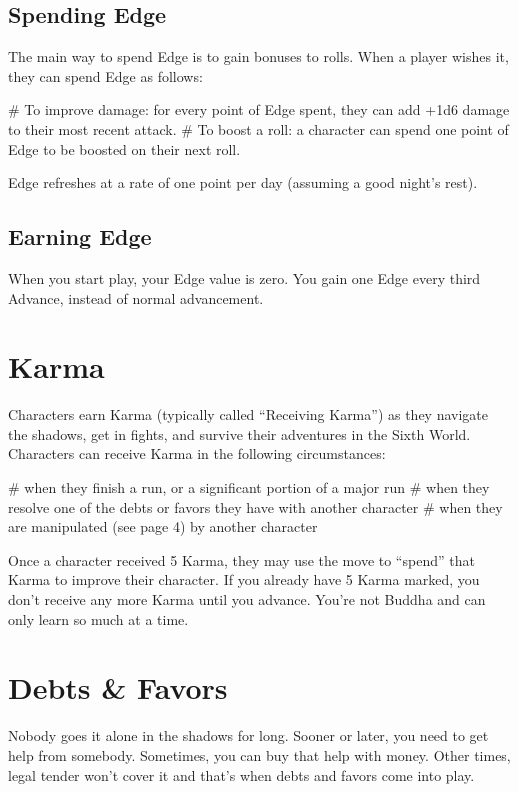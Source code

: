 \subsection{Spending Edge}
The main way to spend Edge is to gain bonuses to rolls. When a player wishes it, they can spend Edge as follows:

\begin{easylist}
    # To improve damage: for every point of Edge spent, they can add +1d6 damage to their most recent attack.
    # To boost a roll: a character can spend one point of Edge to be boosted on their next roll.    
\end{easylist}

Edge refreshes at a rate of one point per day (assuming a good night’s rest).

\subsection{Earning Edge}
When you start play, your Edge value is zero. You gain one Edge every third Advance, instead of normal advancement.


\section{Karma}

Characters earn Karma (typically called ``Receiving Karma'') as they navigate the shadows, get in fights, and survive their adventures in the Sixth World. Characters can receive Karma in the following circumstances:

\begin{easylist}
# when they finish a run, or a significant portion of a major run
# when they resolve one of the debts or favors they have with another character
# when they are manipulated (see page 4) by another character
\end{easylist}

Once a character received 5 Karma, they may use the  move to ``spend'' that Karma to improve their character. If you already have 5 Karma marked, you don’t receive any more Karma until you advance. You're not Buddha and can only learn so much at a time.


\section{Debts \& Favors}

Nobody goes it alone in the shadows for long. Sooner or later, you need to get help from somebody. Sometimes, you can buy that help with money. Other times, legal tender won’t cover it and that’s when debts and favors come into play.

